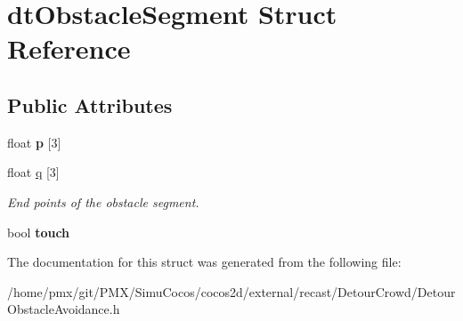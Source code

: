 \hypertarget{structdtObstacleSegment}{}\section{dt\+Obstacle\+Segment Struct Reference}
\label{structdtObstacleSegment}
\subsection*{Public Attributes}
\begin{DoxyCompactItemize}
\item 
\mbox{\label{structdtObstacleSegment_aea8070a66636b6fdd54eae1d832430fb}} 
float {\bfseries p} \mbox{[}3\mbox{]}
\item 
\mbox{\label{structdtObstacleSegment_a14b6ab6fc59a5b9b568c552ae2bca8be}} 
float \hyperlink{structdtObstacleSegment_a14b6ab6fc59a5b9b568c552ae2bca8be}{q} \mbox{[}3\mbox{]}
\begin{DoxyCompactList}\small\item\em End points of the obstacle segment. \end{DoxyCompactList}\item 
\mbox{\label{structdtObstacleSegment_a26ef06bc8db4ec6ceac546dd4d34da83}} 
bool {\bfseries touch}
\end{DoxyCompactItemize}


The documentation for this struct was generated from the following file\+:\begin{DoxyCompactItemize}
\item 
/home/pmx/git/\+P\+M\+X/\+Simu\+Cocos/cocos2d/external/recast/\+Detour\+Crowd/Detour\+Obstacle\+Avoidance.\+h\end{DoxyCompactItemize}
